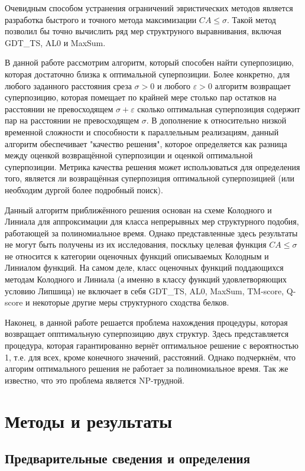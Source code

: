 \documentclass[a4papper]{article}
\newcommand{\eps}{\varepsilon}
\begin{document}
Очевидным способом устранения ограничений эвристических методов является разработка быстрого и точного метода максимизации $CA \leq \sigma$. Такой метод позволил бы точно вычислить ряд мер структруного выравнивания, включая GDT\_TS, AL0 и MaxSum.

В данной работе рассмотрим алгоритм, который способен найти суперпозицию, которая достаточно близка к оптимальной суперпозиции. Более конкретно, для любого заданного расстояния среза $\sigma > 0$ и любого $\eps > 0$ алгоритм возвращает суперпозицию, которая помещает по крайней мере столько пар остатков на расстоянии не превосходящем $\sigma + \eps$ сколько оптимальная суперпозиция содержит пар на расстоянии не превосходящем $\sigma$. В дополнение к относительно низкой временной сложности и способности к параллельным реализациям, данный алгоритм обеспечивает "качество решения", которое определяется как разница между оценкой возвращённой суперпозиции и оценкой оптимальной суперпозиции. Метрика качества решения может использоваться для определения того, является ли возвращённая суперпозиция оптимальной суперпозицией (или необходим дургой более подробный поиск).

Данный алгоритм приближённого решения основан на схеме Колодного и Линиала для аппроксимации для класса непрерывных мер структурного подобия, работающей за полиномиальное время. Однако представленные здесь  результаты не могут быть получены из их исследования, поскльку целевая функция $CA \leq \sigma$ не относится к категории оценочных функций описываемых Колодным и Линиалом функций. На самом деле, класс оценочных функций поддающихся методам Колодного и Линиала (а именно в классу функций удовлетворяющих условию Липшица) не включает в себя GDT\_TS, AL0, MaxSum, TM-score, Q-score и некоторые другие меры структурного сходства белков.

Наконец, в данной работе решается проблема нахождения процедуры, которая возвращает опптимальную суперпозицию двух структур. Здесь представляется процедура, которая гарантированно вернёт оптимальное решение с вероятностью 1, т.е. для всех, кроме конечного значений, расстояний. Однако подчеркнём, что алгорим оптимального решения не работает за полиномиальное время. Так же известно, что это проблема является NP-трудной.

\section{ Методы и результаты }
\subsection{Предварительные сведения и определения}
\end{document}
